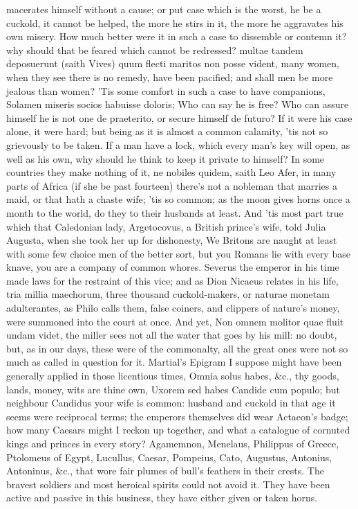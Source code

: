 {macerates himself without a cause; or put case which is the worst, he
be a cuckold, it cannot be helped, the more he stirs in it, the more he
aggravates his own misery. How much better were it in such a case to
dissemble or contemn it? why should that be feared which cannot be
redressed? multae tandem deposuerunt (saith Vives) quum flecti
maritos non posse vident, many women, when they see there is no remedy,
have been pacified; and shall men be more jealous than women? 'Tis some
comfort in such a case to have companions, Solamen miseris socios
habuisse doloris; Who can say he is free? Who can assure himself he is
not one de praeterito, or secure himself de futuro? If it were his case
alone, it were hard; but being as it is almost a common calamity, 'tis
not so grievously to be taken. If a man have a lock, which every man's
key will open, as well as his own, why should he think to keep it
private to himself? In some countries they make nothing of it, ne
nobiles quidem, saith Leo Afer, in many parts of Africa (if she
be past fourteen) there's not a nobleman that marries a maid, or that
hath a chaste wife; 'tis so common; as the moon gives horns once a
month to the world, do they to their husbands at least. And 'tis most
part true which that Caledonian lady, Argetocovus, a British
prince's wife, told Julia Augusta, when she took her up for dishonesty,
We Britons are naught at least with some few choice men of the better
sort, but you Romans lie with every base knave, you are a company of
common whores. Severus the emperor in his time made laws for the
restraint of this vice; and as Dion Nicaeus relates in his life,
tria millia maechorum, three thousand cuckold-makers, or naturae
monetam adulterantes, as Philo calls them, false coiners, and clippers
of nature's money, were summoned into the court at once. And yet, Non
omnem molitor quae fluit undam videt, the miller sees not all the water
that goes by his mill: no doubt, but, as in our days, these were of the
commonalty, all the great ones were not so much as called in question
for it. Martial's Epigram I suppose might have been generally
applied in those licentious times, Omnia solus habes, \&c., thy goods,
lands, money, wits are thine own, Uxorem sed habes Candide cum populo;
but neighbour Candidus your wife is common: husband and cuckold in that
age it seems were reciprocal terms; the emperors themselves did wear
Actaeon's badge; how many Caesars might I reckon up together, and what
a catalogue of cornuted kings and princes in every story? Agamemnon,
Menelaus, Philippus of Greece, Ptolomeus of Egypt, Lucullus, Caesar,
Pompeius, Cato, Augustus, Antonius, Antoninus, \&c., that wore fair
plumes of bull's feathers in their crests. The bravest soldiers and
most heroical spirits could not avoid it. They have been active and
passive in this business, they have either given or taken horns.

}
